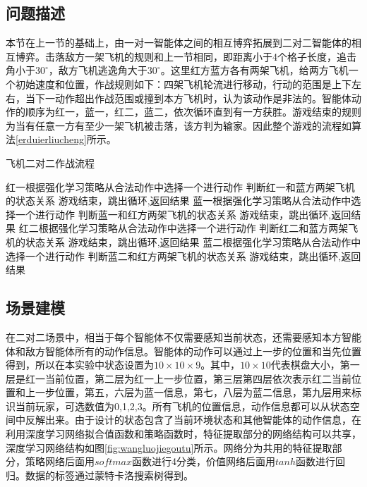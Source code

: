 \subsection{问题描述}
本节在上一节的基础上，由一对一智能体之间的相互博弈拓展到二对二智能体的相互博弈。击落敌方一架飞机的规则和上一节相同，即距离小于4个格子长度，追击角小于$30^\circ$，敌方飞机逃逸角大于$30^\circ$。这里红方蓝方各有两架飞机，给两方飞机一个初始速度和位置，作战规则如下：四架飞机轮流进行移动，行动的范围是上下左右，当下一动作超出作战范围或撞到本方飞机时，认为该动作是非法的。智能体动作的顺序为红一，蓝一，红二，蓝二，依次循环直到有一方获胜。游戏结束的规则为当有任意一方有至少一架飞机被击落，该方判为输家。因此整个游戏的流程如算法\ref{erduierliucheng}所示。
\begin{algorithm}[htbp]
	\caption{飞机二对二作战流程}%
	\label{erduierliucheng}
	\begin{algorithmic}[1]%
		\State 红一根据强化学习策略从合法动作中选择一个进行动作
		\State 判断红一和蓝方两架飞机的状态关系
		\State 游戏结束，跳出循环,返回结果
		\EndIf
		\State 蓝一根据强化学习策略从合法动作中选择一个进行动作
		\State 判断蓝一和红方两架飞机的状态关系
		\State 游戏结束，跳出循环,返回结果
		\EndIf
		\State 红二根据强化学习策略从合法动作中选择一个进行动作
		\State 判断红二和蓝方两架飞机的状态关系
		\State 游戏结束，跳出循环,返回结果
		\EndIf
		\State 蓝二根据强化学习策略从合法动作中选择一个进行动作
		\State 判断蓝二和红方两架飞机的状态关系
		\State 游戏结束，跳出循环,返回结果
		\EndIf
		\EndFor
	\end{algorithmic}
\end{algorithm}

\subsection{场景建模}

在二对二场景中，相当于每个智能体不仅需要感知当前状态，还需要感知本方智能体和敌方智能体所有的动作信息。智能体的动作可以通过上一步的位置和当先位置得到，所以在本实验中状态设置为$10 \times 10 \times 9$。其中，$10 \times 10$代表棋盘大小，第一层是红一当前位置，第二层为红一上一步位置，第三层第四层依次表示红二当前位置和上一步位置，第五，六层为蓝一信息，第七，八层为蓝二信息，第九层用来标识当前玩家，可选数值为0,1,2,3。所有飞机的位置信息，动作信息都可以从状态空间中反解出来。由于设计的状态包含了当前环境状态和其他智能体的动作信息，在利用深度学习网络拟合值函数和策略函数时，特征提取部分的网络结构可以共享，深度学习网络结构如图\ref{fig:wangluojiegoutu}所示。网络分为共用的特征提取部分，策略网络后面用$softmax$函数进行4分类，价值网络后面用$tanh$函数进行回归。数据的标签通过蒙特卡洛搜索树得到。

